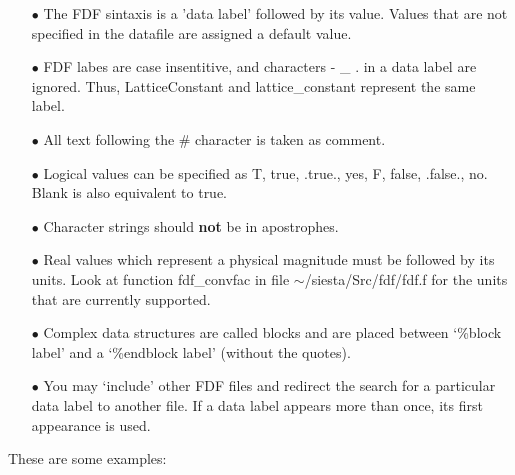 \begin{itemize}

\item[$\bullet$] The FDF sintaxis is a 'data label' followed by its value.
Values that are not specified in the datafile are assigned
a default value. 

\item[$\bullet$] FDF labes are case insentitive, and characters - \_ . 
in a data label are ignored. Thus, LatticeConstant and
lattice\_constant represent the same label.

\item[$\bullet$] All text following the \# character is taken as comment.

\item[$\bullet$] Logical values can be specified as T, true, .true.,
yes, F, false, .false., no. Blank is also equivalent to true.

\item[$\bullet$] Character strings should {\bf not} be in apostrophes.

\item[$\bullet$] Real values which represent a physical magnitude must be
followed by its units. Look at function fdf\_convfac in
file $\sim$/siesta/Src/fdf/fdf.f for the units that are currently supported.

\item[$\bullet$] Complex data structures are called blocks and are
placed between `\%block label' and a `\%endblock label' (without the
quotes).

\item[$\bullet$] You may `include' other FDF files and redirect the search
for a particular data label to another file. 
If a data label appears more than once, its first appearance
is used.

\end{itemize}

\noindent
These are some examples:


